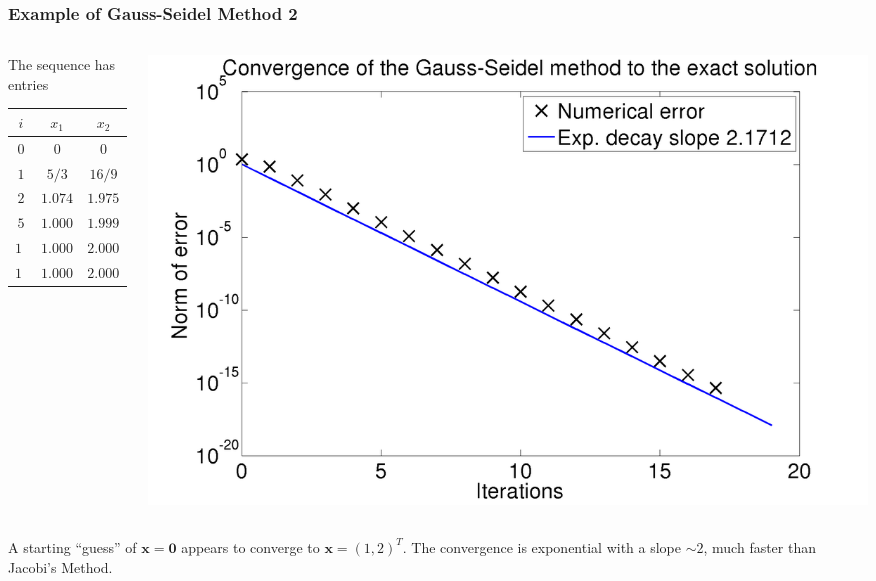 \documentclass{beamer}
\newcommand{\bx}{{\boldsymbol{x}}}
\newcommand{\bfm}[1]{{\boldsymbol{#1}}}
\begin{document}
\begin{frame}
  \frametitle{Example of Gauss-Seidel Method 2}

  \begin{columns}
    \begin{column}{0.475\textwidth}
      The sequence has entries
      \begin{tabular}{|c|c c|}
        $i$ & $x_1$ & $x_2$ \\ \hline
        $0$ & $0$ & $0$ \\
        $1$ & $5 / 3$ & $16 / 9$ \\
        $2$ & $1.074074$ & $1.975309$ \\
        $5$ & $1.000102$ & $1.999966$ \\
        $10$ & $1.000000$ & $2.000000$ \\
        $100$ & $1.000000$ & $2.000000$
      \end{tabular}
    \end{column}
    \begin{column}{0.525\textwidth}
      \begin{center}
        \includegraphics[width=\textwidth]{figures/GaussSeidel1}
      \end{center}
    \end{column}
  \end{columns}

  \vspace{1ex}

  A starting ``guess'' of $\bx = \bfm{0}$ appears to converge to $\bx
  = (1, 2)^T$. The convergence is exponential with a slope $\sim 2$,
  much faster than Jacobi's Method.

\end{frame}
\end{document}
